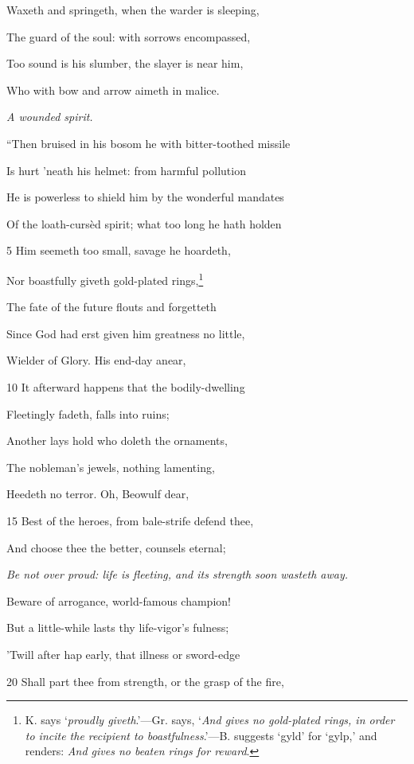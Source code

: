 Waxeth and springeth, when the warder is sleeping,

The guard of the soul: with sorrows encompassed,

Too sound is his slumber, the slayer is near him,

Who with bow and arrow aimeth in malice.



\emph{A wounded spirit.}

“Then bruised in his bosom he with bitter-toothed missile

Is hurt ’neath his helmet: from harmful pollution

He is powerless to shield him by the wonderful mandates

Of the loath-cursèd spirit; what too long he hath holden

5
Him seemeth too small, savage he hoardeth,

Nor boastfully giveth gold-plated rings,\footnote{K. says ‘\emph{proudly giveth}.’—Gr. says, ‘\emph{And gives no gold-plated rings, in
order to incite the recipient to boastfulness}.’—B. suggests ‘gyld’ for ‘gylp,’
and renders: \emph{And gives no beaten rings for reward}.}

The fate of the future flouts and forgetteth

Since God had erst given him greatness no little,

Wielder of Glory. His end-day anear,

10
It afterward happens that the bodily-dwelling

Fleetingly fadeth, falls into ruins;

Another lays hold who doleth the ornaments,

The nobleman’s jewels, nothing lamenting,

Heedeth no terror. Oh, Beowulf dear,

15
Best of the heroes, from bale-strife defend thee,

And choose thee the better, counsels eternal;

\emph{Be not over proud:
life is fleeting, and
its strength soon
wasteth away.}

Beware of arrogance, world-famous champion!

But a little-while lasts thy life-vigor’s fulness;

’Twill after hap early, that illness or sword-edge

20
Shall part thee from strength, or the grasp of the fire,

